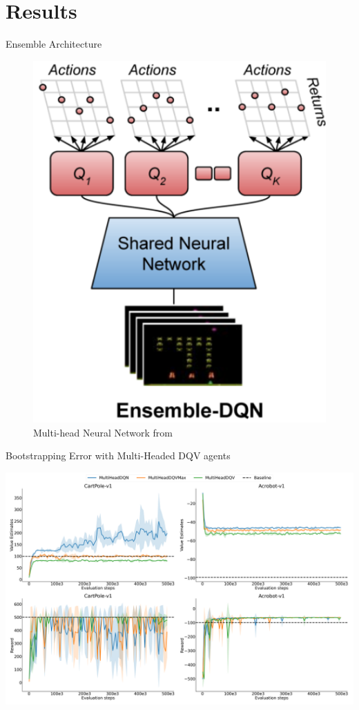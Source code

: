 \documentclass[presentation]{beamer}
\begin{document}
\section{Results}
\label{sec:orgbe4cfb5}
\begin{frame}[label={sec:org235f3e6}]{Ensemble Architecture}
\begin{figure}[htbp]
\centering
\includegraphics[width=.45\textwidth]{./hydra_nn_arch.png}
\caption{\label{fig:orgd7aec56}Multi-head Neural Network from \citeauthor{agarwal2020optimistic}}
\end{figure}
\end{frame}

\begin{frame}[label={sec:org2735942}]{Bootstrapping Error with Multi-Headed DQV agents}
\begin{center}
\includegraphics[width=\textwidth]{./dshift_plots_ensembles.png}
\end{center}
\end{frame}
\end{document}
